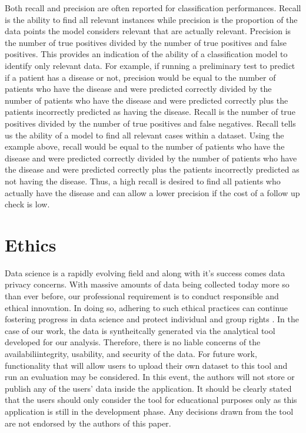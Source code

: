 \documentclass{llncs}
\begin{document}
\noindent 
Both recall and precision are often reported for classification performances.  Recall is the ability to find all relevant instances while precision is the proportion of the data points the model considers relevant that are actually relevant.  Precision is the number of true positives divided by the number of true positives and false positives.  This provides an indication of the ability of a classification model to identify only relevant data.  For example, if running a preliminary test to predict if a patient has a disease or not, precision would be equal to the number of patients who have the disease and were predicted correctly divided by the number of patients who have the disease and were predicted correctly plus the patients incorrectly predicted as having the disease.  Recall is the number of true positives divided by the number of true positives and false negatives. Recall tells us the ability of a model to find all relevant cases within a dataset.  Using the example above, recall would be equal to the number of patients who have the disease and were predicted correctly divided by the number of patients who have the disease and were predicted correctly plus the patients incorrectly predicted as not having the disease. Thus, a high recall is desired to find all patients who actually have the disease and can allow a lower precision if the cost of a follow up check is low.

\section{Ethics}
\noindent 
Data science is a rapidly evolving field and along with it's success comes data privacy concerns. With massive amounts of data being collected today more so than ever before, our professional requirement is to conduct responsible and ethical innovation. In doing so, adhering to such ethical practices can continue fostering progress in data science and protect individual and group rights \cite{floridi}. In the case of our work, the data is syntheitcally generated via the analytical tool developed for our analysis. Therefore, there is no liable concerns of the availabiliintegrity, usability, and security of the data. For future work, functionality that will allow users to upload their own dataset to this tool and run an evaluation may be considered. In this event, the authors will not store or publish any of the users' data inside the application. It should be clearly stated that the users should only consider the tool for educational purposes only as this application is still in the development phase. Any decisions drawn from the tool are not endorsed by the authors of this paper. 
\end{document}
